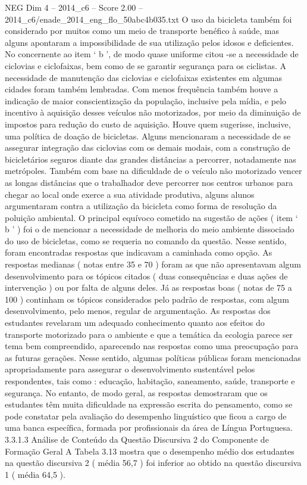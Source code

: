 \begin{textsample}{NEG Dim 4 – 2014\_c6 – Score 2.00 – 2014\_c6/enade\_2014\_eng\_flo\_50abc4b035.txt}
O uso da bicicleta também foi considerado por muitos como um meio de transporte benéfico à saúde, mas alguns apontaram a impossibilidade de sua utilização pelos idosos e deficientes.
No concernente ao item ‘ b ’, de modo quase uniforme citou -se a necessidade de ciclovias e ciclofaixas, bem como de se garantir segurança para os ciclistas.
A necessidade de manutenção das ciclovias e ciclofaixas existentes em algumas cidades foram também lembradas.
Com menos frequência também houve a indicação de maior conscientização da população, inclusive pela mídia, e pelo incentivo à aquisição desses veículos não motorizados, por meio da diminuição de impostos para redução do custo de aquisição.
Houve quem sugerisse, inclusive, uma política de doação de bicicletas.
Alguns mencionaram a necessidade de se assegurar integração das ciclovias com os demais modais, com a construção de bicicletários seguros diante das grandes distâncias a percorrer, notadamente nas metrópoles.
Também com base na dificuldade de o veículo não motorizado vencer as longas distâncias que o trabalhador deve percorrer nos centros urbanos para chegar ao local onde exerce a sua atividade produtiva, alguns alunos argumentaram contra a utilização da bicicleta como forma de resolução da poluição ambiental.
O principal equívoco cometido na sugestão de ações ( item ‘ b ’ ) foi o de mencionar a necessidade de melhoria do meio ambiente dissociado do uso de bicicletas, como se requeria no comando da questão.
Nesse sentido, foram encontradas respostas que indicavam a caminhada como opção.
As respostas medianas ( notas entre 35 e 70 ) foram as que não apresentavam algum desenvolvimento para os tópicos citados ( duas consequências e duas ações de intervenção ) ou por falta de alguns deles.
Já as respostas boas ( notas de 75 a 100 ) continham os tópicos considerados pelo padrão de respostas, com algum desenvolvimento, pelo menos, regular de argumentação.
As respostas dos estudantes revelaram um adequado conhecimento quanto aos efeitos do transporte motorizado para o ambiente e que a temática da ecologia parece ser tema bem compreendido, aparecendo nas respostas como uma preocupação para as futuras gerações.
Nesse sentido, algumas políticas públicas foram mencionadas apropriadamente para assegurar o desenvolvimento sustentável pelos respondentes, tais como : educação, habitação, saneamento, saúde, transporte e segurança.
No entanto, de modo geral, as respostas demostraram que os estudantes têm muita dificuldade na expressão escrita do pensamento, como se pode constatar pela avaliação do desempenho linguístico que ficou a cargo de uma banca específica, formada por profissionais da área de Língua Portuguesa. 3.3.1.3 Análise de Conteúdo da Questão Discursiva 2 do Componente de Formação Geral A Tabela 3.13 mostra que o desempenho médio dos estudantes na questão discursiva 2 ( média 56,7 ) foi inferior ao obtido na questão discursiva 1 ( média 64,5 ).

\end{textsample}

